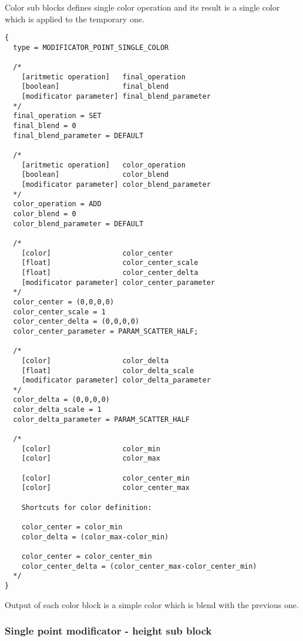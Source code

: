 \documentclass[9pt]{article}
\begin{document}
Color sub blocks defines single color operation and its result
is a single color which is applied to the temporary one.
\begin{verbatim}
{
  type = MODIFICATOR_POINT_SINGLE_COLOR

  /*  
    [aritmetic operation]   final_operation
    [boolean]               final_blend
    [modificator parameter] final_blend_parameter
  */
  final_operation = SET
  final_blend = 0
  final_blend_parameter = DEFAULT
  
  /*
    [aritmetic operation]   color_operation
    [boolean]               color_blend
    [modificator parameter] color_blend_parameter
  */
  color_operation = ADD
  color_blend = 0
  color_blend_parameter = DEFAULT
  
  /*
    [color]                 color_center
    [float]                 color_center_scale
    [float]                 color_center_delta
    [modificator parameter] color_center_parameter
  */
  color_center = (0,0,0,0)
  color_center_scale = 1
  color_center_delta = (0,0,0,0)
  color_center_parameter = PARAM_SCATTER_HALF;
  
  /*
    [color]                 color_delta
    [float]                 color_delta_scale
    [modificator parameter] color_delta_parameter
  */
  color_delta = (0,0,0,0)
  color_delta_scale = 1
  color_delta_parameter = PARAM_SCATTER_HALF
  
  /*
    [color]                 color_min
    [color]                 color_max

    [color]                 color_center_min
    [color]                 color_center_max
    
    Shortcuts for color definition:

    color_center = color_min
    color_delta = (color_max-color_min)
    
    color_center = color_center_min
    color_center_delta = (color_center_max-color_center_min)
  */  
}
\end{verbatim}
Output of each color block is a simple color which is blend with
the previous one.

\subsubsection{Single point modificator - height sub block}
\end{document}
